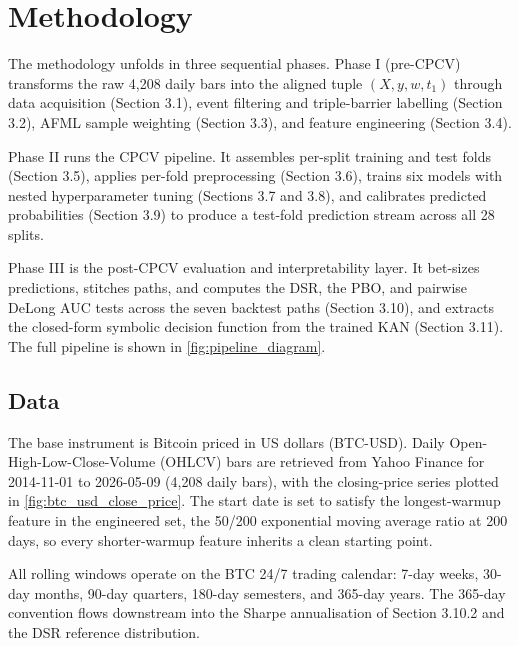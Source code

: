 \newpage
\section{Methodology}\label{sec:methodology}

The methodology unfolds in three sequential phases. Phase I (pre-CPCV) transforms the raw 4,208 daily bars into the aligned tuple $(X, y, w, t_1)$ through data acquisition (Section 3.1), event filtering and triple-barrier labelling (Section 3.2), AFML sample weighting (Section 3.3), and feature engineering (Section 3.4).

Phase II runs the CPCV pipeline. It assembles per-split training and test folds (Section 3.5), applies per-fold preprocessing (Section 3.6), trains six models with nested hyperparameter tuning (Sections 3.7 and 3.8), and calibrates predicted probabilities (Section 3.9) to produce a test-fold prediction stream across all 28 splits.

Phase III is the post-CPCV evaluation and interpretability layer. It bet-sizes predictions, stitches paths, and computes the DSR, the PBO, and pairwise DeLong AUC tests across the seven backtest paths (Section 3.10), and extracts the closed-form symbolic decision function from the trained KAN (Section 3.11). The full pipeline is shown in \label{ref:pipeline_call}\autoref{fig:pipeline_diagram}.


\subsection{Data}\label{subsec:data}

The base instrument is Bitcoin priced in US dollars (BTC-USD). Daily Open-High-Low-Close-Volume (OHLCV) bars are retrieved from Yahoo Finance for 2014-11-01 to 2026-05-09 (4,208 daily bars), with the closing-price series plotted in \label{ref:btc_price_call}\autoref{fig:btc_usd_close_price}. The start date is set to satisfy the longest-warmup feature in the engineered set, the 50/200 exponential moving average ratio at 200 days, so every shorter-warmup feature inherits a clean starting point.

All rolling windows operate on the BTC 24/7 trading calendar: 7-day weeks, 30-day months, 90-day quarters, 180-day semesters, and 365-day years. The 365-day convention flows downstream into the Sharpe annualisation of Section 3.10.2 and the DSR reference distribution.

